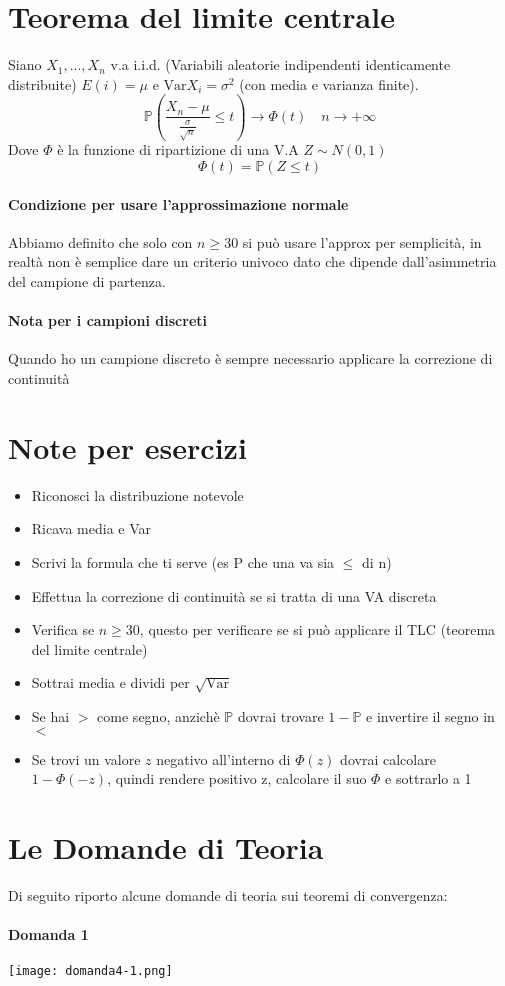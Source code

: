 \section{Teorema del limite centrale}
Siano $X_1, ..., X_n$ v.a i.i.d. (Variabili aleatorie indipendenti identicamente distribuite)
$E(i) = \mu$ e $\text{Var}X_i = \sigma^2$ (con media e varianza finite).
\begin{equation*}
    \mathbb{P} (\frac{X_n-\mu}{\frac{\sigma}{\sqrt{n}}} \leq t) \rightarrow \Phi (t) \quad n \rightarrow + \infty   
\end{equation*}
Dove $\Phi$ è la funzione di ripartizione di una V.A $Z\sim N(0,1)$
\begin{equation*}
    \Phi(t) = \mathbb{P}(Z \leq t)
\end{equation*}
\paragraph*{Condizione per usare l'approssimazione normale} Abbiamo definito 
che solo con $n \geq 30$ si può usare l'approx per semplicità, in realtà non è semplice
dare un criterio univoco dato che dipende dall'asimmetria del campione di partenza.
\paragraph*{Nota per i campioni discreti} Quando ho un campione discreto è sempre necessario
applicare la correzione di continuità 

\section*{Note per esercizi}
\begin{itemize}
    \item Riconosci la distribuzione notevole
    \item Ricava media e Var
    \item Scrivi la formula che ti serve (es P che una va sia $\leq$ di n)
    \item Effettua la correzione di continuità se si tratta di una VA discreta
    \item Verifica se $n\geq 30$, questo per verificare se si può applicare il TLC (teorema del limite centrale)
    \item Sottrai media e dividi per $\sqrt{\text{Var}}$
    \item Se hai $>$ come segno, anzichè $\mathbb{P}$ dovrai trovare $1-\mathbb{P}$ e invertire il segno in $<$
    \item Se trovi un valore $z$ negativo all'interno di $\Phi(z)$ dovrai calcolare $1 - \Phi(-z)$, quindi rendere positivo
    z, calcolare il suo $\Phi$ e sottrarlo a 1
\end{itemize}

\pagebreak
\section{Le Domande di Teoria}
Di seguito riporto alcune domande di teoria sui teoremi di convergenza:
\paragraph{Domanda 1}
\begin{center}
    \texttt{[image: domanda4-1.png]}
\end{center}

